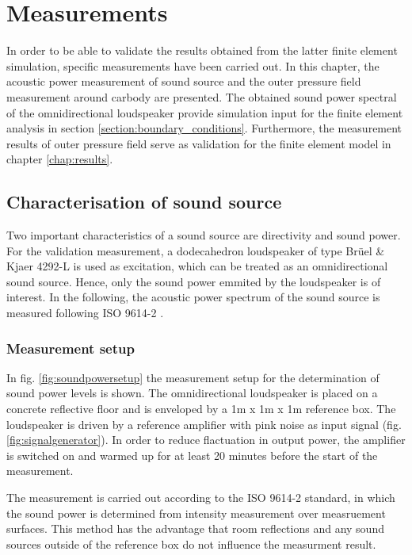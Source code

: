 \chapter{Measurements}
\label{chap:measurement}

In order to be able to validate the results obtained from the latter finite element simulation, specific measurements have been carried out. In this chapter, the acoustic power measurement of sound source and the outer pressure field measurement around carbody are presented. The obtained sound power spectral of the omnidirectional loudspeaker provide simulation input for the finite element analysis in section \ref{section:boundary_conditions}. Furthermore, the measurement results of outer pressure field serve as validation for the finite element model in chapter \ref{chap:results}.

\section{Characterisation of sound source}
\label{section:SWL_measurement}

Two important characteristics of a sound source are directivity and sound power. For the validation measurement, a dodecahedron loudspeaker of type Brüel \& Kjaer 4292-L is used as excitation, which can be treated as an omnidirectional sound source. Hence, only the sound power emmited by the loudspeaker is of interest. In the following, the acoustic power spectrum of the sound source is measured following ISO 9614-2 \cite{din19969614}.

\subsection*{Measurement setup}

In fig. \ref{fig:soundpowersetup} the measurement setup for the determination of sound power levels is shown. The omnidirectional loudspeaker is placed on a concrete reflective floor and is enveloped by a 1m x 1m x 1m reference box. The loudspeaker is driven by a reference amplifier with pink noise as input signal (fig. \ref{fig:signalgenerator}). In order to reduce flactuation in output power, the amplifier is switched on and warmed up for at least 20 minutes before the start of the measurement.

The measurement is carried out according to the ISO 9614-2 standard, in which the sound power is determined from intensity measurement over measruement surfaces. This method has the advantage that room reflections and any sound sources outside of the
reference box do not influence the measurment result.

